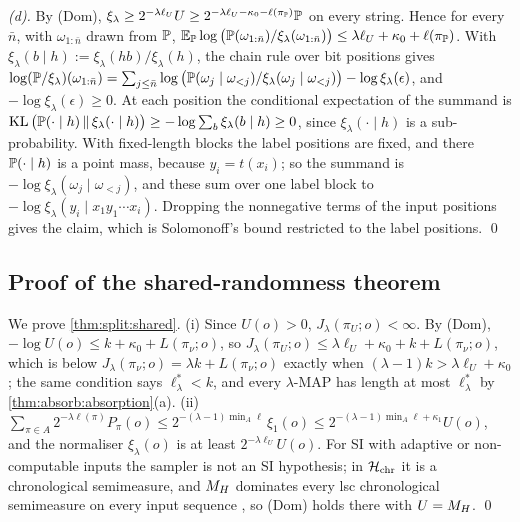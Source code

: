 \emph{(d).} By (Dom), $\xi_\lambda\ge2^{-\lambda\ell_U}U\ge2^{-\lambda\ell_U-\kappa_0-\ell(\pi_{\mathbb{P}})}\mathbb{P}$ on every string. Hence for every $\bar n$, with $\omega_{1:\bar n}$ drawn from $\mathbb{P}$, $\mathbb{E}_{\mathbb{P}}\log\big(\mathbb{P}(\omega_{1:\bar n})/\xi_\lambda(\omega_{1:\bar n})\big)\le\lambda\ell_U+\kappa_0+\ell(\pi_{\mathbb{P}})$. With $\xi_\lambda(b\mid h):=\xi_\lambda(hb)/\xi_\lambda(h)$, the chain rule over bit positions gives $\log(\mathbb{P}/\xi_\lambda)(\omega_{1:\bar n})=\sum_{j\le\bar n}\log\big(\mathbb{P}(\omega_j\mid\omega_{<j})/\xi_\lambda(\omega_j\mid\omega_{<j})\big)-\log\xi_\lambda(\epsilon)$, and $-\log\xi_\lambda(\epsilon)\ge0$. At each position the conditional expectation of the summand is $\operatorname{KL}\big(\mathbb{P}(\cdot\mid h)\,\|\,\xi_\lambda(\cdot\mid h)\big)\ge-\log\sum_b\xi_\lambda(b\mid h)\ge0$, since $\xi_\lambda(\cdot\mid h)$ is a sub-probability. With fixed-length blocks the label positions are fixed, and there $\mathbb{P}(\cdot\mid h)$ is a point mass, because $y_i=t(x_i)$; so the summand is $-\log\xi_\lambda(\omega_j\mid\omega_{<j})$, and these sum over one label block to $-\log\xi_\lambda(y_i\mid x_1y_1\cdots x_i)$. Dropping the nonnegative terms of the input positions gives the claim, which is Solomonoff's bound \citep{solomonoff1978complexity} restricted to the label positions. \qed

\subsection{Proof of the shared-randomness theorem}\label{app:split:shared}

We prove \cref{thm:split:shared}. (i) Since $U(o)>0$, $J_\lambda(\pi_U;o)<\infty$. By (Dom), $-\log U(o)\le k+\kappa_0+L(\pi_\nu;o)$, so $J_\lambda(\pi_U;o)\le\lambda\ell_U+\kappa_0+k+L(\pi_\nu;o)$, which is below $J_\lambda(\pi_\nu;o)=\lambda k+L(\pi_\nu;o)$ exactly when $(\lambda-1)k>\lambda\ell_U+\kappa_0$; the same condition says $\ell^*_\lambda<k$, and every $\lambda$-MAP has length at most $\ell^*_\lambda$ by \cref{thm:absorb:absorption}(a). (ii) $\sum_{\pi\in A}2^{-\lambda\ell(\pi)}P_\pi(o)\le2^{-(\lambda-1)\min_A\ell}\,\xi_1(o)\le2^{-(\lambda-1)\min_A\ell+\kappa_1}U(o)$, and the normaliser $\xi_\lambda(o)$ is at least $2^{-\lambda\ell_U}U(o)$. For SI with adaptive or non-computable inputs the sampler is not an SI hypothesis; in $\mathcal{H}_{\mathrm{chr}}$ it is a chronological semimeasure, and $M_{H}$ dominates every lsc chronological semimeasure on every input sequence \citep[Corollary~6.17(a)]{claudeSFI2026fundamentals}, so (Dom) holds there with $U=M_{H}$. \qed%

